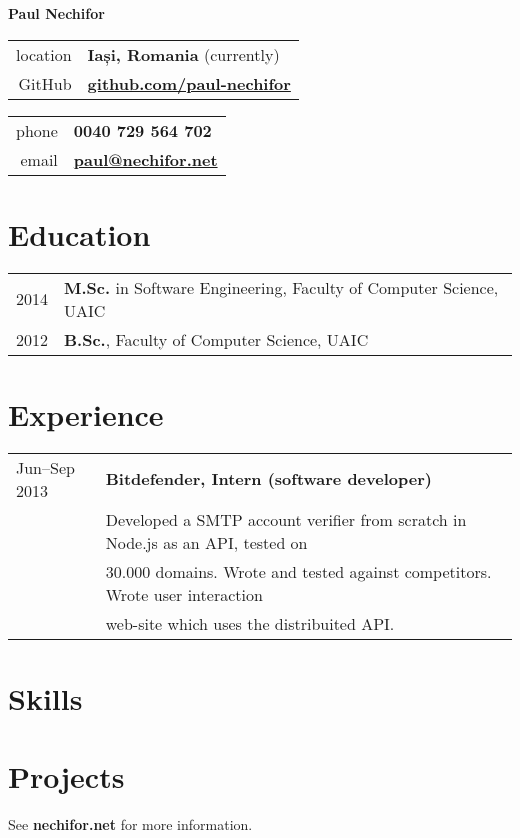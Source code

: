 \documentclass[a4wide]{article}
\newcommand{\sub}[1]{\section*{#1}}
\begin{document}
\thispagestyle{empty}

\centerline{\LARGE \bf Paul Nechifor}
\vspace{1cm}

\begin{minipage}{0.50\linewidth}
\begin{center}
\begin{tabular}{rl}
  location& {\bf Iași, Romania} (currently)\\
  GitHub& \href{http://github.com/paul-nechifor}{\bf github.com/paul-nechifor}
\end{tabular}
\end{center}
\end{minipage}
\begin{minipage}{0.50\linewidth}
\begin{center}
\begin{tabular}{rl}
  phone& {\bf 0040 729 564 702}\\
  email& \href{mailto:paul@nechifor.net}{\bf paul@nechifor.net}\\
\end{tabular}
\end{center}
\end{minipage}

\sub{Education}

\begin{tabular}{@{}ll@{}}
	2014 & {\bf M.Sc.} in Software Engineering, Faculty of Computer Science, UAIC\\
	2012 & {\bf B.Sc.}, Faculty of Computer Science, UAIC\\
\end{tabular}

\sub{Experience}

\begin{tabular}{@{}ll@{}}
	Jun--Sep 2013&	{\bf Bitdefender, Intern (software developer)}\\
	  & Developed a SMTP account verifier from scratch in Node.js as an API, tested on\\
	  & 30.000 domains. Wrote and tested against competitors. Wrote user interaction\\
    & web-site which uses the distribuited API.\\
\end{tabular}

\sub{Skills}

\sub{Projects}

\vspace{2cm}
\centerline{See \textbf{nechifor.net} for more information.}
\end{document}
